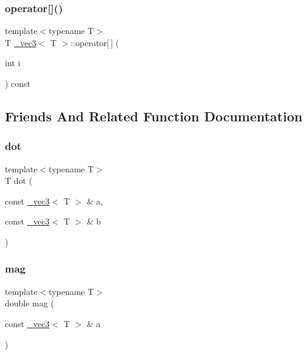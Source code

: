 \subsubsection{\texorpdfstring{operator[]()}{operator[]()}\hspace{0.1cm}{\footnotesize\ttfamily [2/2]}}
{\footnotesize\ttfamily template$<$typename T$>$ \\
T \hyperlink{class__vec3}{\+\_\+vec3}$<$ T $>$\+::operator\mbox{[}$\,$\mbox{]} (\begin{DoxyParamCaption}\item[{int}]{i }\end{DoxyParamCaption}) const\hspace{0.3cm}{\ttfamily [inline]}}



\subsection{Friends And Related Function Documentation}
\mbox{\label{class__vec3_a9660915089ddf52a1798ea286b791df4}} 
\subsubsection{\texorpdfstring{dot}{dot}}
{\footnotesize\ttfamily template$<$typename T$>$ \\
T dot (\begin{DoxyParamCaption}\item[{const \hyperlink{class__vec3}{\+\_\+vec3}$<$ T $>$ \&}]{a,  }\item[{const \hyperlink{class__vec3}{\+\_\+vec3}$<$ T $>$ \&}]{b }\end{DoxyParamCaption})\hspace{0.3cm}{\ttfamily [friend]}}

\mbox{\label{class__vec3_af97e6c6a1941f3e6f25d630a814f162b}} 
\subsubsection{\texorpdfstring{mag}{mag}}
{\footnotesize\ttfamily template$<$typename T$>$ \\
double mag (\begin{DoxyParamCaption}\item[{const \hyperlink{class__vec3}{\+\_\+vec3}$<$ T $>$ \&}]{a }\end{DoxyParamCaption})\hspace{0.3cm}{\ttfamily [friend]}}

